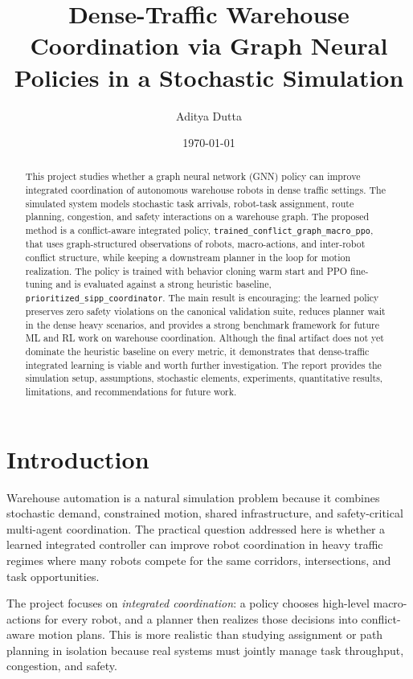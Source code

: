 \documentclass[11pt]{article}
\title{Dense-Traffic Warehouse Coordination via Graph Neural Policies in a Stochastic Simulation}
\author{Aditya Dutta}
\date{\today}
\begin{document}
\maketitle

\begin{abstract}
This project studies whether a graph neural network (GNN) policy can improve integrated coordination of autonomous warehouse robots in dense traffic settings. The simulated system models stochastic task arrivals, robot-task assignment, route planning, congestion, and safety interactions on a warehouse graph. The proposed method is a conflict-aware integrated policy, \texttt{trained\_conflict\_graph\_macro\_ppo}, that uses graph-structured observations of robots, macro-actions, and inter-robot conflict structure, while keeping a downstream planner in the loop for motion realization. The policy is trained with behavior cloning warm start and PPO fine-tuning and is evaluated against a strong heuristic baseline, \texttt{prioritized\_sipp\_coordinator}. The main result is encouraging: the learned policy preserves zero safety violations on the canonical validation suite, reduces planner wait in the dense heavy scenarios, and provides a strong benchmark framework for future ML and RL work on warehouse coordination. Although the final artifact does not yet dominate the heuristic baseline on every metric, it demonstrates that dense-traffic integrated learning is viable and worth further investigation. The report provides the simulation setup, assumptions, stochastic elements, experiments, quantitative results, limitations, and recommendations for future work.
\end{abstract}

\section{Introduction}
Warehouse automation is a natural simulation problem because it combines stochastic demand, constrained motion, shared infrastructure, and safety-critical multi-agent coordination. The practical question addressed here is whether a learned integrated controller can improve robot coordination in heavy traffic regimes where many robots compete for the same corridors, intersections, and task opportunities.

The project focuses on \emph{integrated coordination}: a policy chooses high-level macro-actions for every robot, and a planner then realizes those decisions into conflict-aware motion plans. This is more realistic than studying assignment or path planning in isolation because real systems must jointly manage task throughput, congestion, and safety.
\end{document}
